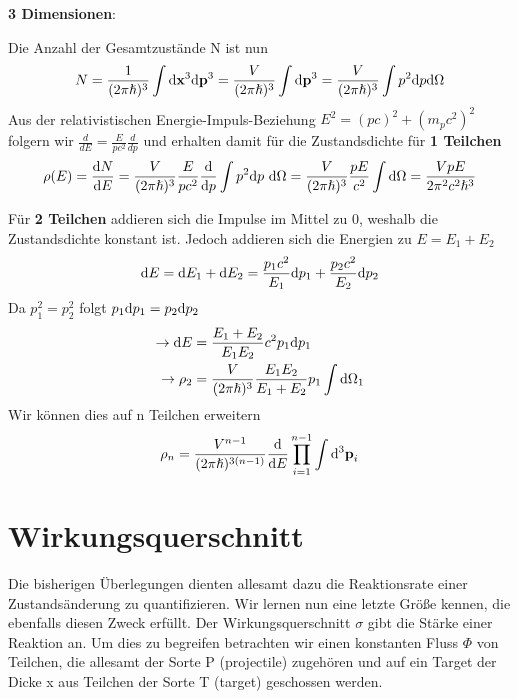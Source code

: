 \documentclass[Ex4_Zusammenfassung.tex]{subfiles}
\begin{document}
 \textbf{3 Dimensionen}:
 
 Die Anzahl der Gesamtzustände N ist nun
 \begin{equation}
	 N = \frac{1}{(2 \pi \hslash)^3} \int \mathrm{d}\textbf{x}^3 \mathrm{d}\textbf{p}^3 = \frac{V}{(2 \pi \hslash)^3} \int \mathrm{d}\textbf{p}^3 = \frac{V}{(2 \pi \hslash)^3} \int p^2 \mathrm{d} p   \mathrm{d}\Omega 
 \end{equation}
 Aus der relativistischen Energie-Impuls-Beziehung $ E^2 = (pc)^2 +  (m_pc^2)^2 $ folgern wir $ \frac{d}{dE} = \frac{E}{pc^2} \frac{d}{dp} $ und erhalten damit für die Zustandsdichte für \textbf{1 Teilchen}
\begin{equation}
	\rho(E) = \frac{\mathrm{d} N}{\mathrm{d} E} = \frac{V}{(2 \pi \hslash)^3}  \frac{E}{pc^2} \frac{\mathrm{d} }{\mathrm{d} p}  \int p^2 \mathrm{d} p \  \mathrm{d}\Omega =  \frac{V}{(2 \pi \hslash)^3} \frac{pE}{c^2} \int \mathrm{d} \Omega = \frac{VpE}{2 \pi^2 c^2 \hslash^3}
\end{equation}

Für \textbf{2 Teilchen} addieren sich die Impulse im Mittel zu 0, weshalb die Zustandsdichte konstant ist. Jedoch addieren sich die Energien zu $ E = E_1 + E_2 $
\begin{equation}
	\mathrm{d} E = \mathrm{d} E_1 + \mathrm{d} E_2 = \frac{p_1c^2}{E_1} \mathrm{d} p_1 + \frac{p_2c^2}{E_2} \mathrm{d} p_2
\end{equation}
Da $ p_1^2 = p_2^2 $ folgt $  p_1 \mathrm{d} p_{1} = p_2 \mathrm{d} p_{2} $ 
\begin{align*}
	\rightarrow \mathrm{d} E &= \frac{E_1 + E_2}{E_1E_2} c^2 p_1 \mathrm{d} p_1  \\
	\rightarrow  \rho_2 &=   \frac{V}{(2 \pi \hslash)^3} \frac{E_1E_2}{E_1+E_2} p_{1} \int \mathrm{d}\Omega_{1}
\end{align*}
Wir können dies auf n Teilchen erweitern
\begin{equation}
	\rho_{n} = \frac{V^{n-1}}{(2 \pi \hslash)^{3(n-1)}} \frac{\mathrm{d} }{\mathrm{d} E} \prod_{i=1}^{n-1} \int \mathrm{d}^3 \textbf{p}_{i} 
\end{equation}

\section{Wirkungsquerschnitt}
Die bisherigen Überlegungen dienten allesamt dazu die Reaktionsrate einer Zustandsänderung zu quantifizieren. Wir lernen nun eine letzte Größe kennen, die ebenfalls diesen Zweck erfüllt.
Der Wirkungsquerschnitt $ \sigma $ gibt die Stärke einer Reaktion an. Um dies zu begreifen betrachten wir einen konstanten Fluss  $\Phi $ von Teilchen, die allesamt der Sorte P (projectile) zugehören und auf ein Target der Dicke x aus Teilchen der Sorte T (target) geschossen werden.  
\end{document}
